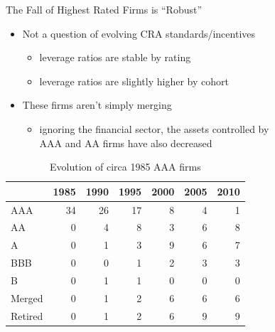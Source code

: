 \documentclass{beamer}
\begin{document}
\begin{frame}[label=robust]{The Fall of Highest Rated Firms is ``Robust''}
\begin{itemize}
	\item Not a question of evolving CRA standards/incentives
	\begin{itemize}
		\item leverage ratios are stable by rating
		\item leverage ratios are slightly higher by cohort
	\end{itemize}
	\hyperlink{app}{}
	\item These firms aren't simply merging
	\begin{itemize}
		\item ignoring the financial sector, the assets controlled by \\ AAA and AA firms have also decreased
	\end{itemize}
\end{itemize}
\begin{table}\centering
\small
\begin{tabular}{l *{6}r}
\toprule
  	& 1985  & 1990  & 1995  & 2000  & 2005  & 2010\\ \midrule
AAA  	& 34  	& 26  	& 17  	& 8  	& 4  	& 1\\
AA  	& 0  	& 4  	& 8  	& 3  	& 6  	& 8\\
A  	& 0  	& 1  	& 3  	& 9  	& 6  	& 7\\
BBB  	& 0  	& 0  	& 1  	& 2  	& 3  	& 3\\
B  	& 0  	& 1  	& 1  	& 0  	& 0  	& 0\\
Merged 	& 0  	& 1  	& 2  	& 6  	& 6  	& 6\\
Retired	& 0  	& 1  	& 2  	& 6  	& 9  	& 9\\ 
\bottomrule
\end{tabular}
\caption{Evolution of circa 1985 AAA firms}
\end{table}
\end{frame}

\end{document}
